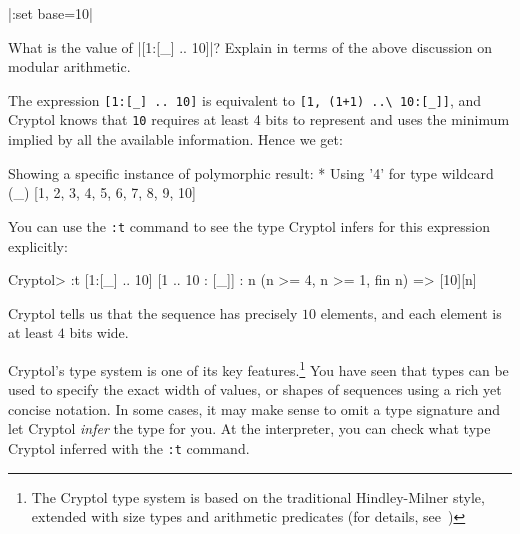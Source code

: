 \restartrepl
\hidereplin|:set base=10|
\begin{Exercise}\label{ex:arith:10}
  What is the value of \replin|[1:[_] .. 10]|? Explain in terms of the above
  discussion on modular arithmetic.\indModular
\end{Exercise}
\begin{Answer}
  The expression \Verb|[1:[_] .. 10]| is equivalent to
  \Verb|[1, (1+1) ..\ 10:[_]]|, and Cryptol knows that \Verb|10|
  requires at least 4 bits to represent and uses the minimum implied
  by all the available information. Hence we get:
\begin{reploutVerb}
  Showing a specific instance of polymorphic result:
    * Using '4' for type wildcard (_)
  [1, 2, 3, 4, 5, 6, 7, 8, 9, 10]
\end{reploutVerb}
  You can use the \Verb|:t|
  command to see the type Cryptol infers for this expression explicitly:
\begin{replPrompt}
    Cryptol> :t [1:[_] .. 10]
    [1 .. 10 : [_]] : {n} (n >= 4, n >= 1, fin n) => [10][n]
\end{replPrompt}
Cryptol tells us that the sequence has precisely $10$ elements, and each
element is at least $4$ bits wide.
\end{Answer}


Cryptol's type system is one of its key features.\footnote{The Cryptol
  type system is based on the traditional Hindley-Milner style,
  extended with size types and arithmetic
  predicates (for details, see~\cite{erkok-carlsson-wick-cryptolCoverification-09,
    erkok-matthews-cryptolEqChecking-09, Hin97})}  You have seen that
types can be used to specify the exact width of values, or shapes of
sequences using a rich yet concise notation.  In some cases, it may
make sense to omit a type signature and let Cryptol {\em infer} the
type for you. At the interpreter, you can check what type Cryptol
inferred with the \texttt{:t} command.


